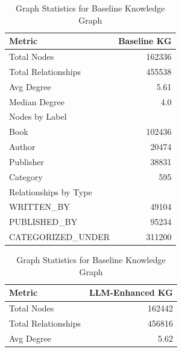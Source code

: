 \documentclass{article}
\begin{document}
\begin{table}[H]
      \centering
      \begin{minipage}{0.45\textwidth}
            \centering
            \begin{tabular}{|l|r|}
                  \hline
                  \textbf{Metric}             & \textbf{Baseline KG} \\ \hline
                  Total Nodes                 & 162336         \\
                  Total Relationships         & 455538         \\
                  Avg Degree                  & 5.61           \\
                  Median Degree               & 4.0            \\ \hline
                  Nodes by Label              &                \\
                  \quad Book                  & 102436         \\
                  \quad Author                & 20474          \\
                  \quad Publisher             & 38831          \\
                  \quad Category              & 595            \\ \hline
                  Relationships by Type       &                \\
                  \quad WRITTEN\_BY           & 49104          \\
                  \quad PUBLISHED\_BY         & 95234          \\
                  \quad CATEGORIZED\_UNDER    & 311200         \\ \hline
            \end{tabular}
            \caption{Graph Statistics for Baseline Knowledge Graph}
            \label{tab:baseline-stats}
      \end{minipage}
      \hfill
      \begin{minipage}{0.45\textwidth}
            \centering
            \begin{tabular}{|l|r|}
                  \hline
                  \textbf{Metric}             & \textbf{LLM-Enhanced KG} \\ \hline
                  Total Nodes                 & 162442         \\
                  Total Relationships         & 456816         \\
                  Avg Degree                  & 5.62           \\

\end{tabular}
\end{minipage}
\end{table}
\end{document}
